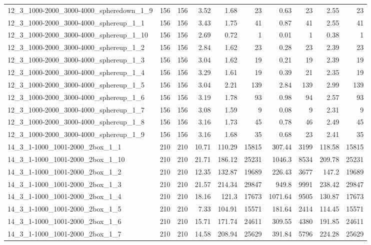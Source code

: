 \begin{center}
\begin{scriptsize}
\begin{longtable}{lrrrrrrrrr}
12\_3\_1000-2000\_3000-4000\_spheredown\_1\_9 & 156 & 156 & 3.52 & 1.68 & 23 & 0.63 & 23 & 2.55 & 23\\
12\_3\_1000-2000\_3000-4000\_sphereup\_1\_1 & 156 & 156 & 3.43 & 1.75 & 41 & 0.87 & 41 & 2.55 & 41\\
12\_3\_1000-2000\_3000-4000\_sphereup\_1\_10 & 156 & 156 & 2.69 & 0.72 & 1 & 0.01 & 1 & 0.38 & 1\\
12\_3\_1000-2000\_3000-4000\_sphereup\_1\_2 & 156 & 156 & 2.84 & 1.62 & 23 & 0.28 & 23 & 2.39 & 23\\
12\_3\_1000-2000\_3000-4000\_sphereup\_1\_3 & 156 & 156 & 3.04 & 1.62 & 19 & 0.21 & 19 & 2.39 & 19\\
12\_3\_1000-2000\_3000-4000\_sphereup\_1\_4 & 156 & 156 & 3.29 & 1.61 & 19 & 0.39 & 21 & 2.35 & 19\\
12\_3\_1000-2000\_3000-4000\_sphereup\_1\_5 & 156 & 156 & 3.04 & 2.21 & 139 & 2.84 & 139 & 2.99 & 139\\
12\_3\_1000-2000\_3000-4000\_sphereup\_1\_6 & 156 & 156 & 3.19 & 1.78 & 93 & 0.98 & 94 & 2.57 & 93\\
12\_3\_1000-2000\_3000-4000\_sphereup\_1\_7 & 156 & 156 & 3.08 & 1.59 & 9 & 0.08 & 9 & 2.31 & 9\\
12\_3\_1000-2000\_3000-4000\_sphereup\_1\_8 & 156 & 156 & 3.16 & 1.73 & 45 & 0.78 & 46 & 2.49 & 45\\
12\_3\_1000-2000\_3000-4000\_sphereup\_1\_9 & 156 & 156 & 3.16 & 1.68 & 35 & 0.68 & 23 & 2.41 & 35\\
14\_3\_1-1000\_1001-2000\_2box\_1\_1 & 210 & 210 & 10.71 & 110.29 & 15815 & 307.44 & 3199 & 118.58 & 15815\\
14\_3\_1-1000\_1001-2000\_2box\_1\_10 & 210 & 210 & 21.71 & 186.12 & 25231 & 1046.3 & 8534 & 209.78 & 25231\\
14\_3\_1-1000\_1001-2000\_2box\_1\_2 & 210 & 210 & 12.35 & 132.87 & 19689 & 226.43 & 3677 & 147.2 & 19689\\
14\_3\_1-1000\_1001-2000\_2box\_1\_3 & 210 & 210 & 21.57 & 214.34 & 29847 & 949.8 & 9991 & 238.42 & 29847\\
14\_3\_1-1000\_1001-2000\_2box\_1\_4 & 210 & 210 & 18.16 & 121.3 & 17673 & 1071.64 & 9505 & 130.87 & 17673\\
14\_3\_1-1000\_1001-2000\_2box\_1\_5 & 210 & 210 & 7.33 & 104.91 & 15571 & 181.64 & 2414 & 114.45 & 15571\\
14\_3\_1-1000\_1001-2000\_2box\_1\_6 & 210 & 210 & 15.71 & 171.74 & 24611 & 309.55 & 4380 & 191.85 & 24611\\
14\_3\_1-1000\_1001-2000\_2box\_1\_7 & 210 & 210 & 14.58 & 208.94 & 25629 & 391.84 & 5796 & 224.28 & 25629\\

\end{longtable}
\end{scriptsize}
\end{center}
